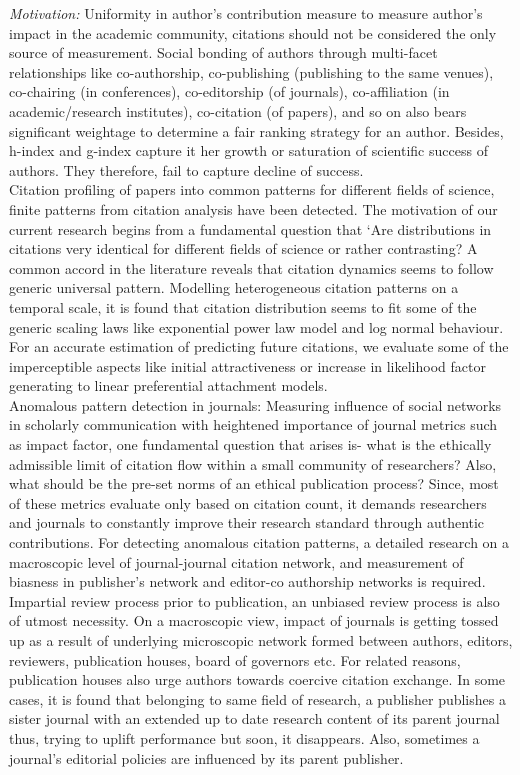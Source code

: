 {\em Motivation:} Uniformity in author’s contribution measure to measure author’s impact in the academic community, citations should not be considered the only source of measurement. Social bonding of authors through multi-facet relationships like co-authorship, co-publishing (publishing to the same venues), co-chairing (in conferences), co-editorship (of journals), co-affiliation (in academic/research institutes), co-citation (of papers), and so on also bears significant weightage to determine a fair ranking strategy for an author. Besides, h-index and g-index capture it her growth or saturation of scientific success of authors. They therefore, fail to capture decline of success.\\
Citation profiling of papers into common patterns for different fields of science, finite patterns from citation analysis have been detected. The motivation of our current research begins from a fundamental question that ‘Are distributions in citations very identical for different fields of science or rather contrasting? A common accord in the literature reveals that citation dynamics seems to follow generic universal pattern. Modelling heterogeneous citation patterns on a temporal scale, it is found that citation distribution seems to fit some of the generic scaling laws like exponential power law model and log normal behaviour. For an accurate estimation of predicting future citations, we evaluate some of the imperceptible aspects like initial attractiveness or increase in likelihood factor generating to linear preferential attachment models.\\
Anomalous pattern detection in journals: Measuring influence of social networks in scholarly communication with heightened importance of journal metrics such as impact factor, one fundamental question that arises is- what is the ethically admissible limit of citation flow within a small community of researchers? Also, what should be the pre-set norms of an ethical publication process? Since, most of these metrics evaluate only based on citation count, it demands researchers and journals to constantly improve their research standard through authentic contributions. For detecting anomalous citation patterns, a detailed research on a macroscopic level of journal-journal citation network, and measurement of biasness in publisher’s network and editor-co authorship networks is required.\\
Impartial review process prior to publication, an unbiased review process is also of utmost necessity. On a macroscopic view, impact of journals is getting tossed up as a result of underlying microscopic network formed between authors, editors, reviewers, publication houses, board of governors etc. For related reasons, publication houses also urge authors towards coercive citation exchange. In some cases, it is found that belonging to same field of research, a publisher publishes a sister journal with an extended up to date research content of its parent journal thus, trying to uplift performance but soon, it disappears. Also, sometimes a journal’s editorial policies are influenced by its parent publisher.\\\\
